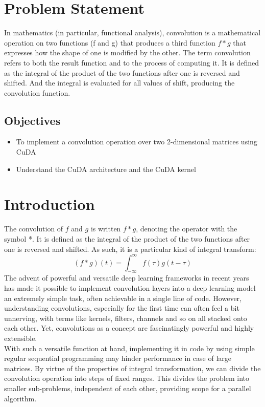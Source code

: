 \documentclass[12pt, letterpaper]{article}
\begin{document}


\tableofcontents
\newpage

\section{Problem Statement}

\hspace*{0.25 in}In mathematics (in particular, functional analysis), convolution is a mathematical operation on two functions (f and g) that produces a third function $f * g$ that expresses how the shape of one is modified by the other. The term convolution refers to both the result function and to the process of computing it. It is defined as the integral of the product of the two functions after one is reversed and shifted. And the integral is evaluated for all values of shift, producing the convolution function.

\subsection{Objectives}
\begin{itemize}
	\item To implement a convolution operation over two 2-dimensional matrices using CuDA
	\item Understand the CuDA architecture and the CuDA kernel
\end{itemize}

\newpage
\section{Introduction}
\hspace*{0.25 in}The convolution of $f$ and $g$ is written $f*g$, denoting the operator with the symbol *. It is defined as the integral of the product of the two functions after one is reversed and shifted. As such, it is a particular kind of integral transform:
	$$
		(f*g)(t) = \int_{-\infty}^{\infty} f(\tau ) g(t- \tau)
	$$
\hspace*{0.25 in}The advent of powerful and versatile deep learning frameworks in recent years has made it possible to implement convolution layers into a deep learning model an extremely simple task, often achievable in a single line of code. However, understanding convolutions, especially for the first time can often feel a bit unnerving, with terms like kernels, filters, channels and so on all stacked onto each other. Yet, convolutions as a concept are fascinatingly powerful and highly extensible.\\
\hspace*{0.25 in}With such a versatile function at hand, implementing it in code by using simple regular sequential programming may hinder performance in case of large matrices. By virtue of the properties of integral transformation, we can divide the convolution operation into steps of fixed ranges. This divides the problem into smaller sub-problems, independent of each other, providing scope for a parallel algorithm. 
\end{document}
